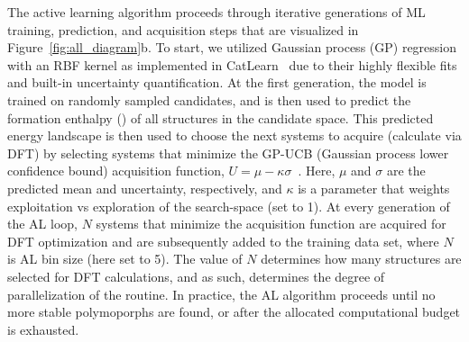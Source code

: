 %
%
The active learning algorithm proceeds through iterative generations of ML training, prediction, and acquisition steps that are visualized in Figure~\ref{fig:all_diagram}b.
%
To start, we utilized Gaussian process (GP) regression with an RBF kernel as implemented in CatLearn~\cite{hansen2019atomistic,CatLearn_Repo} due to their highly flexible fits and built-in uncertainty quantification.
%
%
At the first generation, the model is trained on randomly sampled candidates,
and is then used to predict the formation enthalpy (\DHf) of all structures in the candidate space.
%
This predicted energy landscape is then used to choose the next systems to acquire (calculate via DFT) by selecting systems that minimize the GP-UCB (Gaussian process lower confidence bound) acquisition function,
$U = \mu - \kappa \sigma$~\cite{Cox1992}.
%
Here, $\mu$ and $\sigma$ are the predicted \DHf mean and uncertainty, respectively,
and $\kappa$ is a parameter that weights exploitation vs exploration of the search-space (set to 1).
%
At every generation of the AL loop, $N$ systems that minimize the acquisition function are acquired for DFT optimization and are subsequently added to the training data set, where $N$ is AL bin size (here set to 5).
%
The value of $N$ determines how many structures are selected for DFT calculations,
and as such, determines the degree of parallelization of the routine.
%
%
%
In practice, the AL algorithm proceeds until no more stable polymoporphs are found, or after the allocated computational budget is exhausted.


